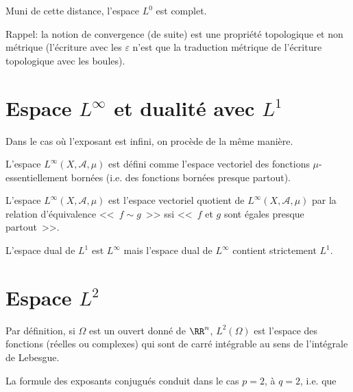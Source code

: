 \begin{theoreme}
Muni de cette distance, l'espace $L^0$ est complet.
\end{theoreme}

\medskip
Rappel: la notion de convergence (de suite) est une propriété topologique et non
métrique (l'écriture avec les $\varepsilon$ n'est que la traduction métrique
de l'écriture topologique avec les boules).

\medskip
\section{Espace $L^\infty$ et dualité avec $L^1$}
Dans le cas où l'exposant est infini, on procède de la même manière.

\medskip
L'espace $L^\infty(X, \mathcal{A}, \mu)$ est défini comme l'espace vectoriel des fonctions
$\mu$-essentiellement bornées (i.e. des fonctions bornées presque partout).

L'espace $L^\infty(X, \mathcal{A}, \mu)$ est l'espace vectoriel quotient de $L^\infty(X, \mathcal{A}, \mu)$
par la relation d'équivalence <<~$f \sim g$~>> ssi <<~$f$ et $g$ sont égales presque partout~>>.

\begin{theoreme}
L'espace dual de $L^1$ est $L^{\infty}$ mais l'espace dual de $L^{\infty}$ contient strictement $L^1$.
\end{theoreme}

\medskip
\section{Espace $L^2$}

Par définition, si $\Omega$ est un ouvert donné de $\RR^n$, $L^2(\Omega)$ est l'espace des
fonctions (réelles ou complexes) qui sont  de carré intégrable au sens de l'intégrale de Lebesgue.

\medskip
\begin{theoreme}
\end{theoreme}

\medskip
La formule des exposants conjugués conduit dans le cas $p=2$, à $q=2$, i.e.
que 


